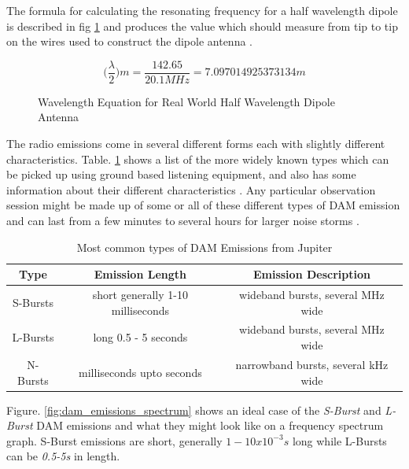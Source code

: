 \documentclass[runningheads,a4paper]{llncs}
\begin{document}
The formula for calculating the resonating frequency for a half wavelength dipole is described in fig \ref{fig:wavelength_equation_dipole} and produces the value which should measure from tip to tip on the wires used to construct the dipole antenna \citep{nasa12}.

%
\begin{figure}[here]
  \centering
  \begin{equation}  	
    \bigg(\frac{\lambda}{2}\bigg)m = \frac{142.65}{20.1 MHz} = 7.097014925373134 m
  \end{equation}
  \caption{Wavelength Equation for Real World Half Wavelength Dipole Antenna}
  \label{fig:wavelength_equation_dipole}
\end{figure}
%

The radio emissions come in several different forms each with slightly different characteristics. Table. \ref{tab:dam_emissions} shows a list of the more widely known types which can be picked up using ground based listening equipment, and also has some information about their different characteristics \citep{wilkinson94}. Any particular observation session might be made up of some or all of these different types of \gls{DAM} emission and can last from a few minutes to several hours for larger noise storms \citep{wilkinson94}.

%
\begin{table}
  \centering
  \begin{tabular}[pos]{| c | c | c |}
    \hline
    Type & Emission Length & Emission Description\\ \hline
    S-Bursts & short generally 1-10 milliseconds & wideband bursts, several MHz wide\\ \hline
    L-Bursts & long 0.5 - 5 seconds & wideband bursts, several MHz wide\\ \hline
    N-Bursts & milliseconds upto seconds & narrowband bursts, several kHz wide\\
    \hline
  \end{tabular}
  \caption{Most common types of DAM Emissions from Jupiter \citep{wilkinson94}}
  \label{tab:dam_emissions}
\end{table}
%

Figure. \ref{fig:dam_emissions_spectrum} shows an ideal case of the \textit{S-Burst} and \textit{L-Burst} \gls{DAM} emissions and what they might look like on a frequency spectrum graph. S-Burst emissions are short, generally $1-10x10^{-3}s$ long while L-Bursts can be \textit{0.5-5s} in length.
\end{document}

